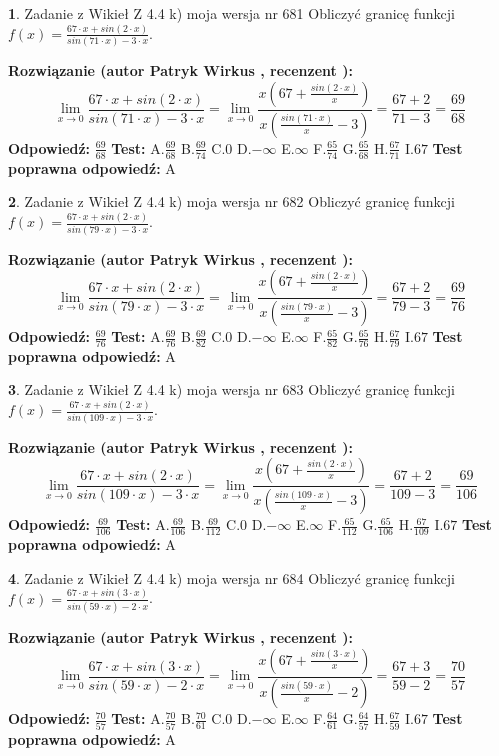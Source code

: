 \documentclass[12pt, a4paper]{article}
\theoremstyle{definition} %
\newtheorem{zad}{}
\newcommand{\zadStart}[1]{\begin{zad}#1\newline}
\newcommand{\zadStop}{\end{zad}}
\newcommand{\rozwStart}[2]{\noindent \textbf{Rozwiązanie (autor #1 , recenzent #2): }\newline}
\newcommand{\rozwStop}{\newline}
\newcommand{\odpStart}{\noindent \textbf{Odpowiedź:}\newline}
\newcommand{\odpStop}{\newline}
\newcommand{\testStart}{\noindent \textbf{Test:}\newline}
\newcommand{\testStop}{\newline}
\newcommand{\kluczStart}{\noindent \textbf{Test poprawna odpowiedź:}\newline}
\newcommand{\kluczStop}{\newline}
\begin{document}
\zadStart{Zadanie z Wikieł Z 4.4 k) moja wersja nr 681}
Obliczyć granicę funkcji $f(x)=\frac{67\cdot x +sin(2\cdot x)}{sin(71\cdot x) -3\cdot x}$.
\zadStop
\rozwStart{Patryk Wirkus}{}
$$\lim\limits_{x\to 0}\frac{67\cdot x +sin(2\cdot x)}{sin(71\cdot x) -3\cdot x}
=\lim\limits_{x\to 0}\frac{x(67+\frac{sin(2\cdot x)}{x})}{x(\frac{sin(71\cdot x)}{x}-3)}
=\frac{67+2}{71-3} = \frac{69}{68}$$
\rozwStop
\odpStart
$\frac{69}{68}$
\odpStop
\testStart
A.$\frac{69}{68}$
B.$\frac{69}{74}$
C.$0$
D.$-\infty$
E.$\infty$
F.$\frac{65}{74}$
G.$\frac{65}{68}$
H.$\frac{67}{71}$
I.$67$
\testStop
\kluczStart
A
\kluczStop



\zadStart{Zadanie z Wikieł Z 4.4 k) moja wersja nr 682}
Obliczyć granicę funkcji $f(x)=\frac{67\cdot x +sin(2\cdot x)}{sin(79\cdot x) -3\cdot x}$.
\zadStop
\rozwStart{Patryk Wirkus}{}
$$\lim\limits_{x\to 0}\frac{67\cdot x +sin(2\cdot x)}{sin(79\cdot x) -3\cdot x}
=\lim\limits_{x\to 0}\frac{x(67+\frac{sin(2\cdot x)}{x})}{x(\frac{sin(79\cdot x)}{x}-3)}
=\frac{67+2}{79-3} = \frac{69}{76}$$
\rozwStop
\odpStart
$\frac{69}{76}$
\odpStop
\testStart
A.$\frac{69}{76}$
B.$\frac{69}{82}$
C.$0$
D.$-\infty$
E.$\infty$
F.$\frac{65}{82}$
G.$\frac{65}{76}$
H.$\frac{67}{79}$
I.$67$
\testStop
\kluczStart
A
\kluczStop



\zadStart{Zadanie z Wikieł Z 4.4 k) moja wersja nr 683}
Obliczyć granicę funkcji $f(x)=\frac{67\cdot x +sin(2\cdot x)}{sin(109\cdot x) -3\cdot x}$.
\zadStop
\rozwStart{Patryk Wirkus}{}
$$\lim\limits_{x\to 0}\frac{67\cdot x +sin(2\cdot x)}{sin(109\cdot x) -3\cdot x}
=\lim\limits_{x\to 0}\frac{x(67+\frac{sin(2\cdot x)}{x})}{x(\frac{sin(109\cdot x)}{x}-3)}
=\frac{67+2}{109-3} = \frac{69}{106}$$
\rozwStop
\odpStart
$\frac{69}{106}$
\odpStop
\testStart
A.$\frac{69}{106}$
B.$\frac{69}{112}$
C.$0$
D.$-\infty$
E.$\infty$
F.$\frac{65}{112}$
G.$\frac{65}{106}$
H.$\frac{67}{109}$
I.$67$
\testStop
\kluczStart
A
\kluczStop



\zadStart{Zadanie z Wikieł Z 4.4 k) moja wersja nr 684}
Obliczyć granicę funkcji $f(x)=\frac{67\cdot x +sin(3\cdot x)}{sin(59\cdot x) -2\cdot x}$.
\zadStop
\rozwStart{Patryk Wirkus}{}
$$\lim\limits_{x\to 0}\frac{67\cdot x +sin(3\cdot x)}{sin(59\cdot x) -2\cdot x}
=\lim\limits_{x\to 0}\frac{x(67+\frac{sin(3\cdot x)}{x})}{x(\frac{sin(59\cdot x)}{x}-2)}
=\frac{67+3}{59-2} = \frac{70}{57}$$
\rozwStop
\odpStart
$\frac{70}{57}$
\odpStop
\testStart
A.$\frac{70}{57}$
B.$\frac{70}{61}$
C.$0$
D.$-\infty$
E.$\infty$
F.$\frac{64}{61}$
G.$\frac{64}{57}$
H.$\frac{67}{59}$
I.$67$
\testStop
\kluczStart
A
\kluczStop
\end{document}
